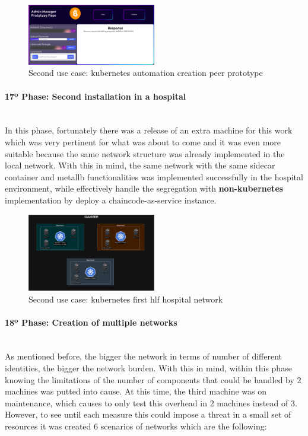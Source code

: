 \begin{figure}[H]
    \centering
    \includegraphics[width=0.5\textwidth]{assets/use-case-2/peer-manager-prototype-page.png} %
    \caption{Second use case: kubernetes automation creation peer prototype}
    \label{fig:sample-image} 
\end{figure}

\paragraph{17º Phase: Second installation in a hospital}\mbox{}\\
In this phase, fortunately there was a release of an extra machine for this work which was very pertinent for what was about to come and it was even more suitable because the same network structure was already implemented in the local network. With this in mind, the same network with the same sidecar container and metallb functionalities was implemented successfully in the hospital environment, while effectively handle the segregation with \textbf{non-kubernetes} implementation by deploy a chaincode-as-service instance.
\begin{figure}[H]
    \centering
    \includegraphics[width=0.5\textwidth]{assets/use-case-2/kubernetes-network.drawio.png} %
    \caption{Second use case: kubernetes first hlf hospital network}
    \label{fig:sample-image} 
\end{figure}

\paragraph{18º Phase: Creation of multiple networks}\mbox{}\\
As mentioned before, the bigger the network in terms of number of different identities, the bigger the network burden. With this in mind, within this phase knowing the limitations of the number of components that could be handled by 2 machines was putted into cause. At this time, the third machine was on maintenance, which causes to only test this overhead in 2 machines instead of 3. However, to see until each measure this could impose a threat in a small set of resources it was created 6 scenarios of networks which are the following:


